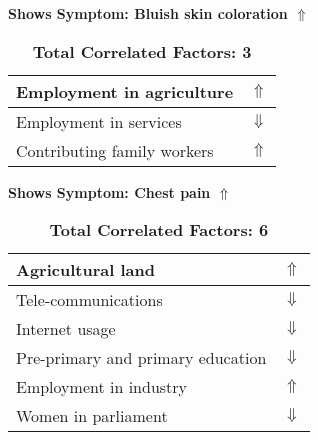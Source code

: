 \documentclass[12pt,notitlepage,oneside]{report}
\begin{document}
\begin{table}[!htb]
\caption{\textbf{Shows Symptom: Bluish skin coloration $\Uparrow$}}
\centering
\label{Correlated Socio-economic Factors0}
\begin{tabular}{|l|l|}
\hline
Employment in agriculture & $\Uparrow$\\ \hline
Employment in services & $\Downarrow$\\ \hline
Contributing family workers & $\Uparrow$\\ \hline
\end{tabular}
\caption*{\textbf{Total Correlated Factors: 3}}
\end{table}
\begin{table}[!htb]
\caption{\textbf{Shows Symptom: Chest pain $\Uparrow$}}
\centering
\label{Correlated Socio-economic Factors0}
\begin{tabular}{|l|l|}
\hline
Agricultural land & $\Uparrow$\\ \hline
Tele-communications & $\Downarrow$\\ \hline
Internet usage & $\Downarrow$\\ \hline
Pre-primary and primary education & $\Downarrow$\\ \hline
Employment in industry & $\Uparrow$\\ \hline
Women in parliament & $\Downarrow$\\ \hline
\end{tabular}
\caption*{\textbf{Total Correlated Factors: 6}}
\end{table}
\end{document}
